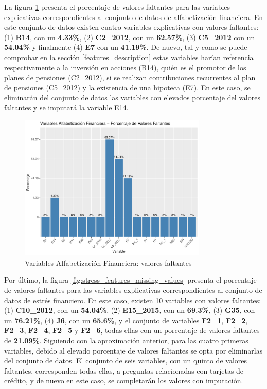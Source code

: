 \documentclass[a4paper, 11pt]{article}
\begin{document}
La figura \ref{fig:capabilities_features_missing_values} presenta el porcentaje de valores 
faltantes para las variables explicativas correspondientes al conjunto de datos de alfabetización
financiera. En este conjunto de datos existen cuatro variables explicativas con valores faltantes:
(1) \textbf{B14}, con un \textbf{4.33\%}, (2) \textbf{C2\_2012}, con un \textbf{62.57\%}, (3) 
\textbf{C5\_2012} con un \textbf{54.04\%} y finalmente (4) \textbf{E7} con un \textbf{41.19\%}. De
nuevo, tal y como se puede comprobar en la sección \ref{features_description} estas variables harían
referencia respectivamente a la inversión en acciones (B14), quién es el promotor de los planes de
pensiones (C2\_2012), si se realizan contribuciones recurrentes al plan de pensiones (C5\_2012) y
la existencia de una hipoteca (E7). En este caso, se eliminarán del conjunto de datos las
variables con elevados porcentaje del valores faltantes y se imputará la variable E14.

\begin{figure}[ht]
    \centering
    \includegraphics[width=0.8\textwidth]{images/Capabilities_Features__Missing_Values.pdf} 
    \caption{Variables Alfabetización Financiera: valores faltantes}
    \label{fig:capabilities_features_missing_values}
\end{figure}

Por último, la figura \ref{fig:stress_features_missing_values} presenta el porcentaje de valores
faltantes para las variables explicativas correspondientes al conjunto de datos de estrés
financiero. En este caso, existen 10 variables con valores faltantes: (1) \textbf{C10\_2012}, con 
un \textbf{54.04\%}, (2) \textbf{E15\_2015}, con un \textbf{69.3\%}, (3) \textbf{G35}, con un 
\textbf{76.21\%}, (4) \textbf{J6}, con un \textbf{65.6\%}, y el conjunto de variables
\textbf{F2\_1}, \textbf{F2\_2}, \textbf{F2\_3}, \textbf{F2\_4}, \textbf{F2\_5} y \textbf{F2\_6}, 
todas ellas con un porcentaje de valores faltantes de \textbf{21.09\%}. Siguiendo con la 
aproximación anterior, para las cuatro primeras variables, debido al elevado porcentaje de 
valores faltantes se opta por eliminarlas del conjunto de datos. El conjunto de seis variables,
con un quinto de valores faltantes, corresponden todas ellas, a preguntas relacionadas con 
tarjetas de crédito, y de nuevo en este caso, se completarán los valores con imputación.
\end{document}
